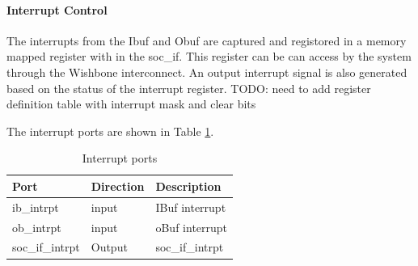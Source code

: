\paragraph{Interrupt Control}  
The interrupts from the Ibuf and Obuf are captured and registored in a memory
mapped register with in the soc\_if. This register can be can access by the
system through the Wishbone interconnect.  An output interrupt signal is also
generated based on the status of the interrupt register.
TODO: need to add register definition table with interrupt mask and clear bits
  
The interrupt ports are shown in Table \ref{tab:socif_intr}.  

\begin{table}[hbt]
\caption{Interrupt ports}
\begin{tabular}{|l|l|l|}
\toprule
Port  & Direction & Description  \\
\midrule
	\hline ib\_intrpt & input & IBuf interrupt \\
	\hline ob\_intrpt & input & oBuf interrupt\\
	\hline soc\_if\_intrpt & Output & soc\_if\_intrpt\\

\bottomrule
\end{tabular}
\label{tab:socif_intr}
\end{table}
